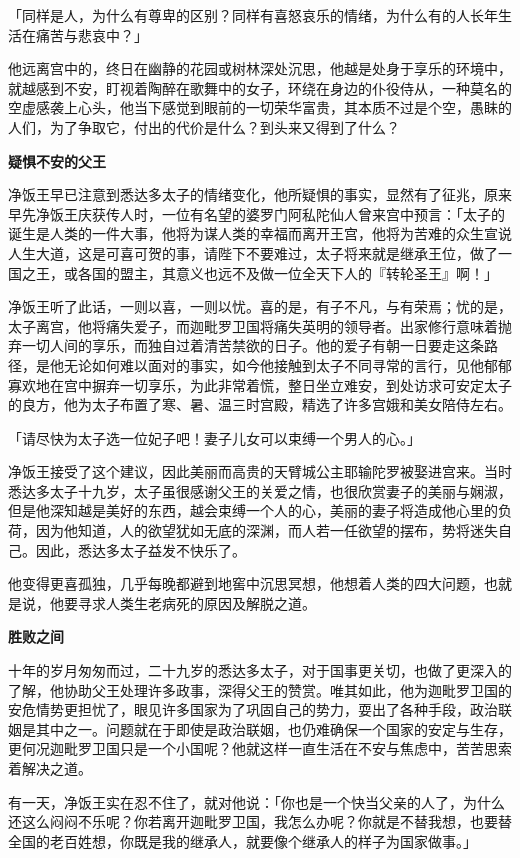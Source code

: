 \documentclass[12pt,twoside,openany]{book}
\newcommand{\mt}[1]{\textbullet \textbf{#1}}
\begin{document}
「同样是人，为什么有尊卑的区别？同样有喜怒哀乐的情绪，为什么有的人长年生活在痛苦与悲哀中？」

他远离宫中的，终日在幽静的花园或树林深处沉思，他越是处身于享乐的环境中，就越感到不安，盯视着陶醉在歌舞中的女子，环绕在身边的仆役侍从，一种莫名的空虚感袭上心头，他当下感觉到眼前的一切荣华富贵，其本质不过是个空，愚眛的人们，为了争取它，付出的代价是什么？到头来又得到了什么？

\mt{疑惧不安的父王}

净饭王早已注意到悉达多太子的情绪变化，他所疑惧的事实，显然有了征兆，原来早先净饭王庆获传人时，一位有名望的婆罗门阿私陀仙人曾来宫中预言：「太子的诞生是人类的一件大事，他将为谋人类的幸福而离开王宫，他将为苦难的众生宣说人生大道，这是可喜可贺的事，请陛下不要难过，太子将来就是继承王位，做了一国之王，或各国的盟主，其意义也远不及做一位全天下人的『转轮圣王』啊！」

净饭王听了此话，一则以喜，一则以忧。喜的是，有子不凡，与有荣焉；忧的是，太子离宫，他将痛失爱子，而迦毗罗卫国将痛失英明的领导者。出家修行意味着抛弃一切人间的享乐，而独自过着清苦禁欲的日子。他的爱子有朝一日要走这条路径，是他无论如何难以面对的事实，如今他接触到太子不同寻常的言行，见他郁郁寡欢地在宫中摒弃一切享乐，为此非常着慌，整日坐立难安，到处访求可安定太子的良方，他为太子布置了寒、暑、温三时宫殿，精选了许多宫娥和美女陪侍左右。

「请尽快为太子选一位妃子吧！妻子儿女可以束缚一个男人的心。」

净饭王接受了这个建议，因此美丽而高贵的天臂城公主耶输陀罗被娶进宫来。当时悉达多太子十九岁，太子虽很感谢父王的关爱之情，也很欣赏妻子的美丽与娴淑，但是他深知越是美好的东西，越会束缚一个人的心，美丽的妻子将造成他心里的负荷，因为他知道，人的欲望犹如无底的深渊，而人若一任欲望的摆布，势将迷失自己。因此，悉达多太子益发不快乐了。

他变得更喜孤独，几乎每晚都避到地窖中沉思冥想，他想着人类的四大问题，也就是说，他要寻求人类生老病死的原因及解脱之道。

\mt{胜败之间}

十年的岁月匆匆而过，二十九岁的悉达多太子，对于国事更关切，也做了更深入的了解，他协助父王处理许多政事，深得父王的赞赏。唯其如此，他为迦毗罗卫国的安危情势更担忧了，眼见许多国家为了巩固自己的势力，耍出了各种手段，政治联姻是其中之一。问题就在于即使是政治联姻，也仍难确保一个国家的安定与生存，更何况迦毗罗卫国只是一个小国呢？他就这样一直生活在不安与焦虑中，苦苦思索着解决之道。

有一天，净饭王实在忍不住了，就对他说：「你也是一个快当父亲的人了，为什么还这么闷闷不乐呢？你若离开迦毗罗卫国，我怎么办呢？你就是不替我想，也要替全国的老百姓想，你既是我的继承人，就要像个继承人的样子为国家做事。」
\end{document}
